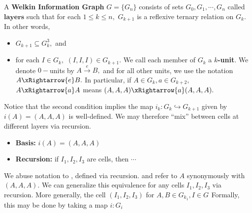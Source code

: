  \begin{definition} A \textbf{Welkin Information Graph} $G = \{G_{n}\}$ consists of sets $G_{0}, G_{1}, \cdots, G_{n}$ called $\textbf{layers}$
   such that for each $1 \leq k \leq n,$ $G_{k+1}$ is a reflexive ternary relation on $G_{k}.$ In other words,
   \begin{itemize}
  \item $G_{k+1} \subseteq G_{k}^{3},$ and
     \item for each $I \in G_{k},$ $(I, I, I) \in G_{k+1}.$
    We call each member of $G_{k}$ a $k$\textbf{-unit}. We denote $0-$units by $A \xrightarrow{e} B,$ and for all other units, we use the notation $A \xRightarrow{e} B.$ In particular, if $A \in G_{k}, a \in G_{k+2},$ $A \xRightarrow{a} A$ means $(A, A, A) \xRightarrow{a} (A, A, A).$

   \end{itemize}
   Notice that the second condition implies the map $i_{k}: G_{k} \hookrightarrow G_{k+1}$ given by $i(A) = (A, A, A)$ is well-defined.
   We may therefore ``mix'' between cells at different layers via recursion.
   \begin{itemize}
     \item \textbf{Basis:} $i(A) = (A, A, A)$
    \item \textbf{Recursion:} if $I_{1}, I_{2}, I_{3}$ are cells, then $\cdots$
   \end{itemize}

    \end{definition}

 We abuse notation to , defined via recursion. and refer to $A$ synonymously with $(A, A, A).$ We can generalize this equivalence for any cells $I_{1}, I_{2}, I_{3}$ via recursion. More generally, the cell $(I_{1}, I_{2}, I_{3})$ for $A, B \in G_{k_1}, I \in G_{}$
 Formally, this may be done by taking a map $i: G_{i}$


